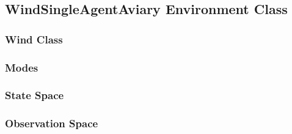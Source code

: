\subsection{WindSingleAgentAviary Environment Class}

\newpage

\subsubsection{Wind Class}

\newpage

\subsubsection{Modes}

\newpage

\subsubsection{State Space}


\subsubsection{Observation Space}

\newpage

